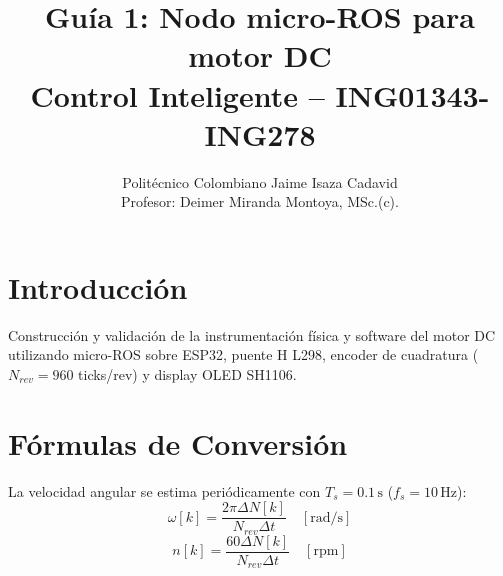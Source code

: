 \documentclass[11pt,a4paper]{article}
\title{\textbf{Guía 1: Nodo micro-ROS para motor DC}\\Control Inteligente -- ING01343-ING278}
\author{Politécnico Colombiano Jaime Isaza Cadavid\\Profesor: Deimer Miranda Montoya, MSc.(c).}
\date{}
\begin{document}
\maketitle

\section{Introducción}
Construcción y validación de la instrumentación física y software del motor DC utilizando micro-ROS sobre ESP32, puente H L298, encoder de cuadratura ($N_{rev} = 960$ ticks/rev) y display OLED SH1106.

\section{Fórmulas de Conversión}
La velocidad angular se estima periódicamente con $T_s = 0.1\,\text{s}$ ($f_s = 10\,\text{Hz}$):
\begin{equation}
\omega[k] = \frac{2\pi \Delta N[k]}{N_{rev} \Delta t} \quad [\text{rad/s}]
\end{equation}
\begin{equation}
n[k] = \frac{60 \Delta N[k]}{N_{rev} \Delta t} \quad [\text{rpm}]
\end{equation}
\end{document}
